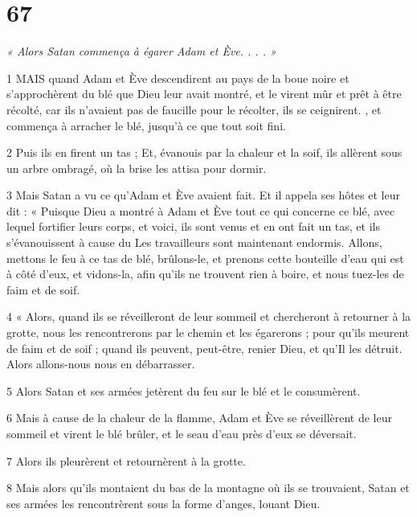\chapter{67}

\par \textit{« Alors Satan commença à égarer Adam et Ève. . . . »}

\par 1 MAIS quand Adam et Ève descendirent au pays de la boue noire et s'approchèrent du blé que Dieu leur avait montré, et le virent mûr et prêt à être récolté, car ils n'avaient pas de faucille pour le récolter, ils se ceignirent. , et commença à arracher le blé, jusqu'à ce que tout soit fini.

\par 2 Puis ils en firent un tas ; Et, évanouis par la chaleur et la soif, ils allèrent sous un arbre ombragé, où la brise les attisa pour dormir.

\par 3 Mais Satan a vu ce qu'Adam et Ève avaient fait. Et il appela ses hôtes et leur dit : « Puisque Dieu a montré à Adam et Ève tout ce qui concerne ce blé, avec lequel fortifier leurs corps, et voici, ils sont venus et en ont fait un tas, et ils s'évanouissent à cause du Les travailleurs sont maintenant endormis. Allons, mettons le feu à ce tas de blé, brûlons-le, et prenons cette bouteille d'eau qui est à côté d'eux, et vidons-la, afin qu'ils ne trouvent rien à boire, et nous tuez-les de faim et de soif.

\par 4 « Alors, quand ils se réveilleront de leur sommeil et chercheront à retourner à la grotte, nous les rencontrerons par le chemin et les égarerons ; pour qu'ils meurent de faim et de soif ; quand ils peuvent, peut-être, renier Dieu, et qu'Il les détruit. Alors allons-nous nous en débarrasser.

\par 5 Alors Satan et ses armées jetèrent du feu sur le blé et le consumèrent.

\par 6 Mais à cause de la chaleur de la flamme, Adam et Ève se réveillèrent de leur sommeil et virent le blé brûler, et le seau d'eau près d'eux se déversait.

\par 7 Alors ils pleurèrent et retournèrent à la grotte.

\par 8 Mais alors qu'ils montaient du bas de la montagne où ils se trouvaient, Satan et ses armées les rencontrèrent sous la forme d'anges, louant Dieu.

